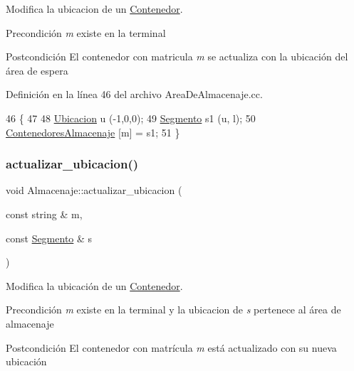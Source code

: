 Modifica la ubicacion de un \hyperlink{class_contenedor}{Contenedor}. 

\begin{DoxyPrecond}{Precondición}
{\itshape m} existe en la terminal 
\end{DoxyPrecond}
\begin{DoxyPostcond}{Postcondición}
El contenedor con matricula {\itshape m} se actualiza con la ubicación del área de espera 
\end{DoxyPostcond}


Definición en la línea 46 del archivo Area\+De\+Almacenaje.\+cc.


\begin{DoxyCode}
46                                                             \{
47     
48     \hyperlink{class_ubicacion}{Ubicacion} u (-1,0,0);
49     \hyperlink{class_segmento}{Segmento} s1 (u, l);
50     \hyperlink{class_almacenaje_ab3cfe0feaf244094a7e2c5225ee681e6}{ContenedoresAlmacenaje} [m] = s1;
51 \}
\end{DoxyCode}
\mbox{\label{class_almacenaje_a4035979df0e66a26d4b98d2b18d3d408}} 
\subsubsection{\texorpdfstring{actualizar\+\_\+ubicacion()}{actualizar\_ubicacion()}}
{\footnotesize\ttfamily void Almacenaje\+::actualizar\+\_\+ubicacion (\begin{DoxyParamCaption}\item[{const string \&}]{m,  }\item[{const \hyperlink{class_segmento}{Segmento} \&}]{s }\end{DoxyParamCaption})}



Modifica la ubicación de un \hyperlink{class_contenedor}{Contenedor}. 

\begin{DoxyPrecond}{Precondición}
{\itshape m} existe en la terminal y la ubicacion de {\itshape s} pertenece al área de almacenaje 
\end{DoxyPrecond}
\begin{DoxyPostcond}{Postcondición}
El contenedor con matrícula {\itshape m} está actualizado con su nueva ubicación 
\end{DoxyPostcond}


